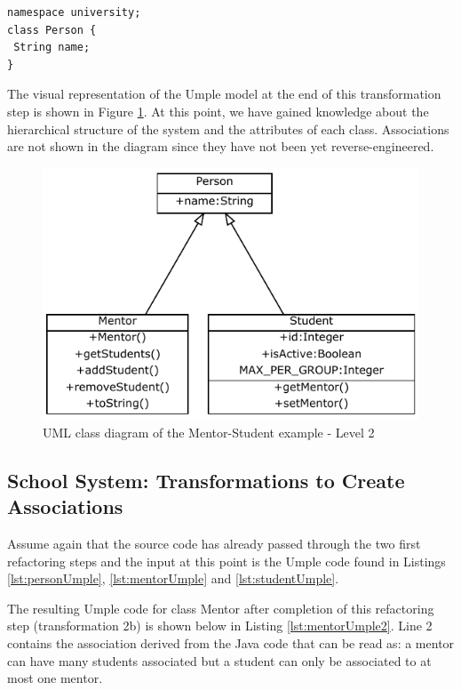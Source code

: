 \begin{lstlisting}[style=UmpleOut,caption=Person.ump,label=lst:personUmple]
namespace university;
class Person {
 String name;
}
\end{lstlisting}

The visual representation of the Umple model at the end of this transformation step is shown in Figure \ref{fig:Example1a2}. At this point, we have gained knowledge about the hierarchical structure of the system and the attributes of each class. Associations are not shown in the diagram since they have not been yet reverse-engineered.

\begin{figure}[h]
\centering
\includegraphics{Figures/Example1a2.pdf} 
\caption{UML class diagram of the Mentor-Student example - Level 2}
\label{fig:Example1a2}
\end{figure}

\subsection{School System: Transformations to Create Associations}

Assume again that the source code has already passed through the two first refactoring steps and the input at this point is the Umple code found in Listings \ref{lst:personUmple}, \ref{lst:mentorUmple} and \ref{lst:studentUmple}.

The resulting Umple code for class Mentor after completion of this refactoring step (transformation 2b) is shown below in Listing \ref{lst:mentorUmple2}. Line 2 contains the association derived from the Java code that can be read as: a mentor can have many students associated but a student can only be associated to at most one mentor. 

